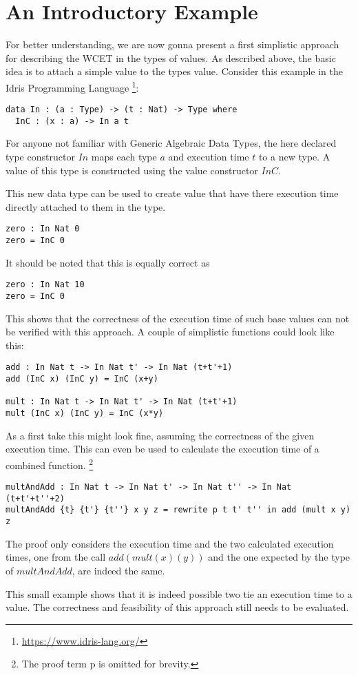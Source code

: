 \documentclass[11pt]{article}
\begin{document}
\section{An Introductory Example}
\label{sec:org1ad0a76}
For better understanding, we are now gonna present a first simplistic approach
for describing the \ac{WCET} in the types of values. 
As described above, the basic idea is to attach a simple value to the types 
value. 
Consider this example in the Idris Programming Language \footnote{\url{https://www.idris-lang.org/}}:
\begin{verbatim}
data In : (a : Type) -> (t : Nat) -> Type where
  InC : (x : a) -> In a t
\end{verbatim}
For anyone not familiar with Generic Algebraic Data Types, the here declared 
type constructor \(\mathit{In}\) maps each type \(a\) and execution time \(t\) to a
new type. 
A value of this type is constructed using the value constructor 
\(\mathit{InC}\). 

This new data type can be used to create value that have there execution time 
directly attached to them in the type. 
\begin{verbatim}
zero : In Nat 0
zero = InC 0
\end{verbatim}
It should be noted that this is equally correct as 
\begin{verbatim}
zero : In Nat 10
zero = InC 0
\end{verbatim}
This shows that the correctness of the execution time of such base values can
not be verified with this approach. 
A couple of simplistic functions could look like this: 
\begin{verbatim}
add : In Nat t -> In Nat t' -> In Nat (t+t'+1)
add (InC x) (InC y) = InC (x+y) 

mult : In Nat t -> In Nat t' -> In Nat (t+t'+1)
mult (InC x) (InC y) = InC (x*y) 
\end{verbatim}
As a first take this might look fine, assuming the correctness 
of the given execution time. 
This can even be used to calculate the execution time of 
a combined function. \footnote{The proof term p is omitted for brevity.}
\begin{verbatim}
multAndAdd : In Nat t -> In Nat t' -> In Nat t'' -> In Nat (t+t'+t''+2)
multAndAdd {t} {t'} {t''} x y z = rewrite p t t' t'' in add (mult x y) z
\end{verbatim}
The proof only considers the execution time and the two calculated 
execution times, one from the call \(\mathit{add}(\mathit{mult}(x)(y))\) and the
one expected by the type of \(\mathit{multAndAdd}\), are indeed the same. 

This small example shows that it is indeed possible two tie an execution time
to a value. 
The correctness and feasibility of this approach still needs to be evaluated.
\end{document}
